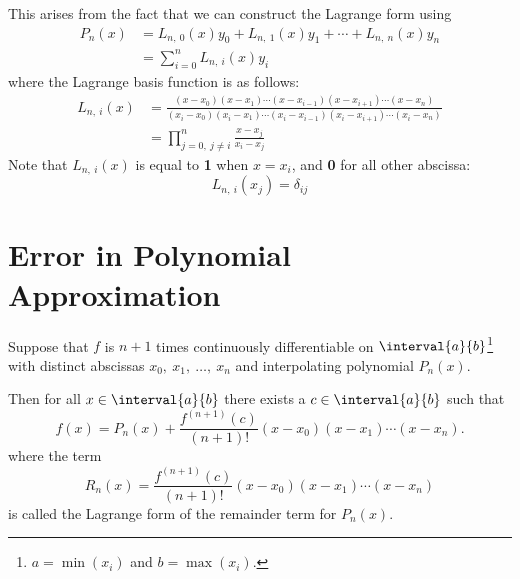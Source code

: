 \documentclass{article}
\begin{document}
This arises from the fact that we can construct the Lagrange form using
\begin{align*}
    P_n\left( x \right) & = L_{n,\: 0}\left( x \right) y_0 + L_{n,\: 1}\left( x \right) y_1 + \cdots + L_{n,\: n}\left( x \right) y_n \\
                        & = \sum_{i = 0}^n L_{n,\: i}\left( x \right) y_i
\end{align*}
where the Lagrange basis function is as follows:
\begin{align*}
    L_{n,\: i}\left( x \right) & = \frac{\left( x - x_0 \right)\left( x - x_1 \right) \cdots \left( x - x_{i - 1} \right) \left( x - x_{i + 1} \right) \cdots \left( x - x_n \right)}{\left( x_i - x_0 \right)\left( x_i - x_1 \right) \cdots \left( x_i - x_{i - 1} \right) \left( x_i - x_{i + 1} \right) \cdots \left( x_i - x_n \right)} \\
                               & = \prod_{j = 0,\: j \neq i}^n \frac{x - x_j}{x_i - x_j}
\end{align*}
Note that \(L_{n,\: i}\left( x \right)\) is equal to \textbf{1} when \(x = x_i\), and \textbf{0} for all other abscissa:
\begin{equation*}
    L_{n,\: i}\left( x_j \right) = \delta_{ij}
\end{equation*}
\section{Error in Polynomial Approximation}
\begin{theorem}
    Suppose that \(f\) is \(n + 1\) times continuously \linebreak differentiable on \(\interval{a}{b}\)\footnote{\(a = \min \left( x_i \right)\) and \(b = \max \left( x_i \right)\).}
    with distinct abscissas \(x_0,\: x_1,\: \dots,\: x_n\) and interpolating polynomial
    \(P_n\left( x \right)\).

    Then for all \(x \in \interval{a}{b}\) there exists a \(c \in \interval{a}{b}\) such that
    \begin{equation*}
        f\left( x \right) = P_n\left( x \right) + \frac{f^{\left( n + 1 \right)} \left( c \right)}{\left( n + 1 \right)!} \left( x - x_0 \right) \left( x - x_1 \right) \cdots \left( x - x_n \right).
    \end{equation*}
    where the term
    \begin{equation*}
        R_n\left( x \right) = \frac{f^{\left( n + 1 \right)} \left( c \right)}{\left( n + 1 \right)!} \left( x - x_0 \right) \left( x - x_1 \right) \cdots \left( x - x_n \right)
    \end{equation*}
    is called the Lagrange form of the remainder term for \(P_n\left( x \right)\).
\end{theorem}
\end{document}
